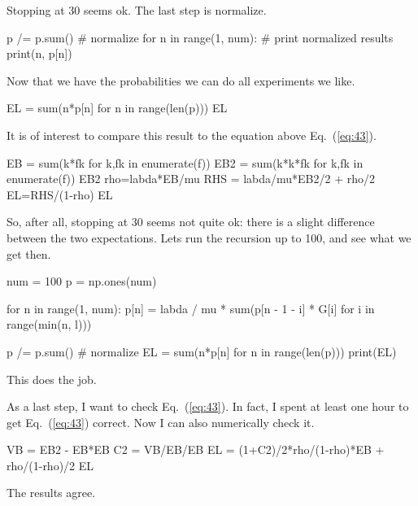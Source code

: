 \begin{exercise}
\begin{solution}
\begin{pyconsole}
\end{pyconsole}
Stopping at 30 seems ok. The last step is normalize.
\begin{pyconsole}
p /= p.sum()  # normalize
for n in range(1, num):  # print normalized results
    print(n, p[n])

\end{pyconsole}

Now that we have the probabilities we can do all experiments we like. 
\begin{pyconsole}
EL = sum(n*p[n] for n in range(len(p)))
EL 
\end{pyconsole}

It is of interest to compare this result to the equation above
Eq.~(\ref{eq:43}).


\begin{pyconsole}
EB = sum(k*fk for k,fk in enumerate(f))
EB2 = sum(k*k*fk for k,fk in enumerate(f))
EB2
rho=labda*EB/mu
RHS = labda/mu*EB2/2 + rho/2
EL=RHS/(1-rho)
EL
\end{pyconsole}

So, after all, stopping at 30 seems not quite ok: there is a slight
difference between the two expectations. Lets run the recursion up to
100, and see what we get then.

\begin{pyconsole}
num = 100
p = np.ones(num)

for n in range(1, num):
    p[n] = labda / mu * sum(p[n - 1 - i] * G[i] for i in range(min(n, l)))

p /= p.sum()  # normalize
EL = sum(n*p[n] for n in range(len(p)))
print(EL)
\end{pyconsole}
This does the job.

As a last step, I want to check Eq.~(\ref{eq:43}). In fact, I spent at least one hour to
get Eq.~(\ref{eq:43}) correct. Now I can also numerically check it.

\begin{pyconsole}
VB = EB2 - EB*EB
C2 = VB/EB/EB
EL = (1+C2)/2*rho/(1-rho)*EB + rho/(1-rho)/2
EL
\end{pyconsole}
The results agree. 
\end{solution}
\end{exercise}


